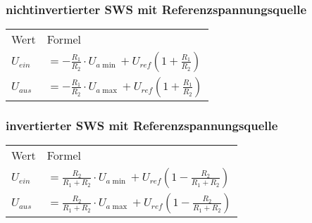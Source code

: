     \begin{minipage}[t][0.4\pdfpageheight][t]{0.5\columnwidth}
        \subsubsection{nichtinvertierter SWS mit Referenzspannungsquelle}
        \renewcommand{\arraystretch}{1.1}
        \begin{table}[H]
            \begin{tabularx}{\columnwidth}{l l}
                Wert      & Formel \\
                $U_{ein}$ & $=-\frac{R_1}{R_2}\cdot U_{a\min}+U_{ref}(1+\frac{R_1}{R_2})$\\
                $U_{aus}$ & $=-\frac{R_1}{R_2}\cdot U_{a\max}+U_{ref}(1+\frac{R_1}{R_2})$\\
            \end{tabularx}
        \end{table}
    \end{minipage}
    \begin{minipage}[t][0.4\pdfpageheight][t]{0.5\columnwidth}
        \subsubsection{invertierter SWS mit Referenzspannungsquelle}
        \renewcommand{\arraystretch}{1.1}
        \begin{table}[H]
            \begin{tabularx}{\columnwidth}{l l}
                Wert      & Formel \\ %
                $U_{ein}$ & $=\frac{R_2}{R_1+R_2}\cdot U_{a\min}+U_{ref}(1-\frac{R_2}{R_1+R_2})$\\
                $U_{aus}$ & $=\frac{R_2}{R_1+R_2}\cdot U_{a\max}+U_{ref}(1-\frac{R_2}{R_1+R_2})$\\
            \end{tabularx}
        \end{table}
    \end{minipage}